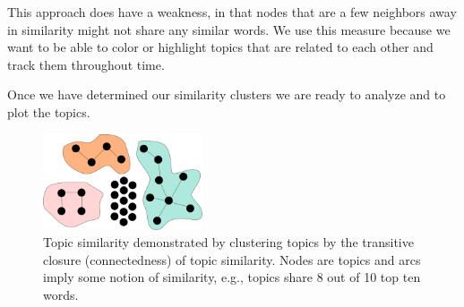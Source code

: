 \documentclass[times, 10pt,twocolumn]{article}
\begin{document}
This approach does have a weakness, in that nodes that are a few neighbors
away in similarity might not share any similar words.  We use this
measure because we want to be able to color or highlight topics that
are related to each other and track them throughout time.

Once we have determined our similarity clusters we are ready to analyze
and to plot the topics.

\begin{figure}[t]
  \centering
  \includegraphics[width=0.42\textwidth]{transitiveclosure}
  \caption{Topic similarity demonstrated by clustering topics by the transitive closure (connectedness)
    of topic similarity. Nodes are topics and
    arcs imply 
some notion of similarity, e.g.,  topics share 8 out of 10 top ten words.}
\label{fig:closure}
\end{figure}
\end{document}
